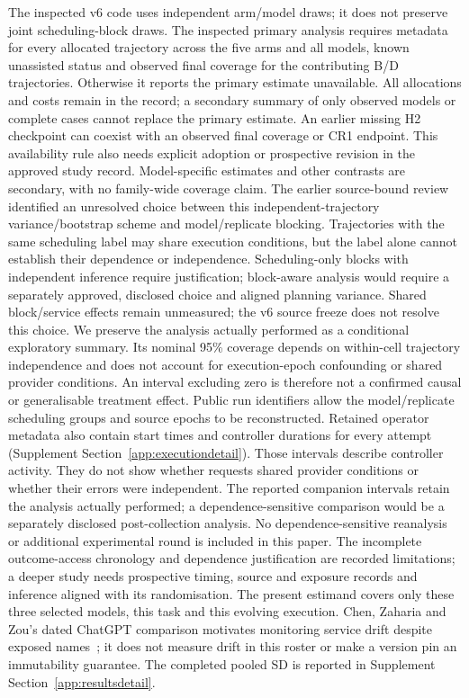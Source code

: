 The inspected v6 code uses independent arm/model draws; it
does not preserve joint scheduling-block draws.
The inspected primary analysis requires metadata for every allocated
trajectory across the five arms and all models, known unassisted status
and observed final coverage for the contributing B/D trajectories.
Otherwise it reports the primary estimate unavailable. All allocations and
costs remain in the record; a secondary summary of only observed models or
complete cases cannot replace the primary estimate. An earlier missing H2
checkpoint can coexist with an observed final coverage or CR1 endpoint.
This availability rule also needs explicit adoption or prospective
revision in the approved study record.
Model-specific estimates and other contrasts are secondary, with no
family-wide coverage claim.
 The earlier source-bound review
identified an unresolved choice between this independent-trajectory
variance/bootstrap scheme and model/replicate blocking.
Trajectories with the same scheduling label may share execution conditions,
but the label alone cannot establish their dependence or independence. Scheduling-only blocks with independent
inference require justification; block-aware analysis would require a
separately approved, disclosed choice and aligned planning variance.
Shared block/service effects remain unmeasured; the v6 source freeze
does not resolve this choice. We preserve the analysis actually performed
as a conditional exploratory summary. Its nominal 95\% coverage depends
on within-cell trajectory independence and does not account for
execution-epoch confounding or shared provider conditions. An interval
excluding zero is therefore not a confirmed causal or generalisable
treatment effect.
Public run identifiers allow the model/replicate scheduling groups and
source epochs to be reconstructed. Retained operator metadata also contain
start times and controller durations for every attempt (Supplement
Section~\ref{app:executiondetail}). Those intervals describe controller activity. They do not show whether
requests shared provider conditions or whether their errors were independent. The reported companion intervals retain the analysis actually
performed; a dependence-sensitive comparison would be a separately
disclosed post-collection analysis.
No dependence-sensitive reanalysis or additional experimental round is
included in this paper. The incomplete outcome-access chronology and
dependence justification are recorded limitations; a deeper study needs
prospective timing, source and exposure records and inference aligned
with its randomisation. The present estimand covers only these three
selected models, this task and this evolving execution.
Chen, Zaharia and Zou's dated ChatGPT comparison motivates monitoring
service drift despite exposed names~\cite{chen2023drift}; it does not
measure drift in this roster or make a version pin an immutability guarantee.
The completed pooled SD is reported in Supplement Section~\ref{app:resultsdetail}.


